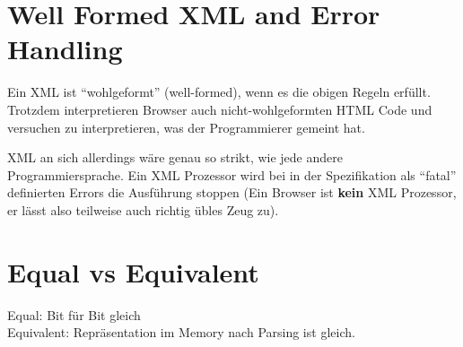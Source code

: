 \section{Well Formed XML and  Error Handling}
Ein XML ist "`wohlgeformt"' (well-formed), wenn es die obigen Regeln erfüllt. Trotzdem interpretieren Browser auch nicht-wohlgeformten HTML Code und versuchen zu interpretieren, was der Programmierer gemeint hat.

XML an sich allerdings wäre genau so strikt, wie jede andere Programmiersprache. Ein XML Prozessor wird bei in der Spezifikation als "`fatal"' definierten Errors die Ausführung stoppen (Ein Browser ist \textbf{kein} XML Prozessor, er lässt also teilweise auch richtig übles Zeug zu).

\section{Equal vs Equivalent}
Equal: Bit für Bit gleich\\
Equivalent: Repräsentation im Memory nach Parsing ist gleich.











